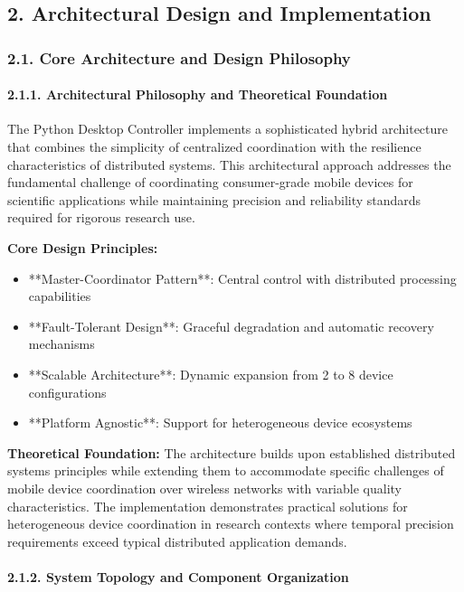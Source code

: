 \documentclass[11pt,a4paper]{article}
\begin{document}
\subsection{2. Architectural Design and Implementation}

\subsubsection{2.1. Core Architecture and Design Philosophy}

\paragraph{2.1.1. Architectural Philosophy and Theoretical Foundation}

The Python Desktop Controller implements a sophisticated hybrid architecture that combines the simplicity of centralized
coordination with the resilience characteristics of distributed systems. This architectural approach addresses the
fundamental challenge of coordinating consumer-grade mobile devices for scientific applications while maintaining
precision and reliability standards required for rigorous research use.

\textbf{Core Design Principles:}

\begin{itemize}
\item **Master-Coordinator Pattern**: Central control with distributed processing capabilities
\item **Fault-Tolerant Design**: Graceful degradation and automatic recovery mechanisms
\item **Scalable Architecture**: Dynamic expansion from 2 to 8 device configurations
\item **Platform Agnostic**: Support for heterogeneous device ecosystems

\end{itemize}
\textbf{Theoretical Foundation:}
The architecture builds upon established distributed systems principles while extending them to accommodate specific
challenges of mobile device coordination over wireless networks with variable quality characteristics. The
implementation demonstrates practical solutions for heterogeneous device coordination in research contexts where
temporal precision requirements exceed typical distributed application demands.

\paragraph{2.1.2. System Topology and Component Organization}
\end{document}
